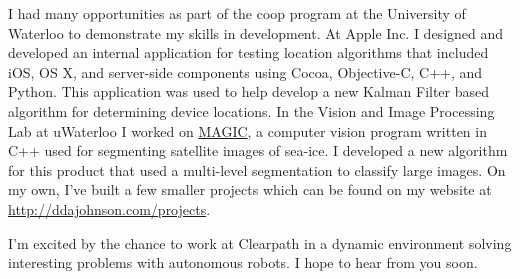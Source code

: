\documentclass[11pt,a4paper,sans]{moderncv} %
\begin{document}
I had many opportunities as part of the coop program at the University of Waterloo to demonstrate my skills in development.  At Apple Inc. I designed and developed an internal application for testing location algorithms that included iOS, OS X, and server-side components using Cocoa, Objective-C, C++, and Python. This application was used to help develop a new Kalman Filter based algorithm for determining device locations. In the Vision and Image Processing Lab at uWaterloo I worked on \href{http://vip.uwaterloo.ca/demos/satellite-sar-sea-ice-classification}{MAGIC}, a computer vision program written in C++ used for segmenting satellite images of sea-ice. I developed a new algorithm for this product that used a multi-level segmentation to classify large images.  On my own, I've built a few smaller projects which can be found on my website at \url{http://ddajohnson.com/projects}.

I'm excited by the chance to work at Clearpath in a dynamic environment solving interesting problems with autonomous robots. I hope to hear from you soon.

\makeletterclosing %

\end{document}
